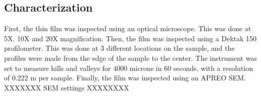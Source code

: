 \subsection{Characterization}

\noindent First, the thin film was inspected using an optical microscope. 
This was done at 5X, 10X and 20X magnification.
Then, the film was inspected using a Dektak 150 profilometer.
This was done at 3 different locations on the sample, and the profiles were made from the edge of the sample to the center.
The instrument was set to measure hills and valleys for 4000 microns in 60 seconds, with a resolution of 0.222 \textmu m per sample.
Finally, the film was inspected using an APREO SEM.
XXXXXXX SEM settings XXXXXXXX